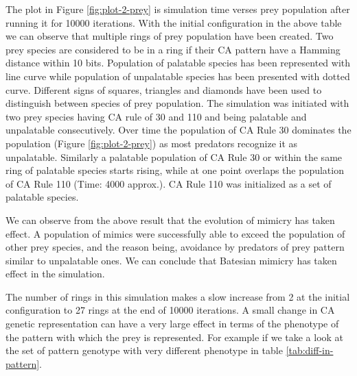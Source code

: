 \documentclass[letterpaper]{article}
\numberwithin{equation}{section}
\begin{document}
The plot in Figure \ref{fig:plot-2-prey} is simulation time verses prey population after running it for 10000 iterations. With the initial configuration in the above table we can observe that multiple rings of prey population have been created. Two prey species are considered to be in a ring if their CA pattern have a Hamming distance within 10 bits. Population of palatable species has been represented with line curve while population of unpalatable species has been presented with dotted curve. Different signs of squares, triangles and diamonds have been used to distinguish between species of prey population. The simulation was initiated with two prey species having CA rule of 30 and 110 and being palatable and unpalatable consecutively. Over time the population of CA Rule 30 dominates the population (Figure \ref{fig:plot-2-prey}) as most predators recognize it as unpalatable. Similarly a palatable population of CA Rule 30 or within the same ring of palatable species starts rising, while at one point overlaps the population of CA Rule 110 (Time: 4000 approx.). CA Rule 110 was initialized as a set of palatable species.

We can observe from the above result that the evolution of mimicry has taken effect. A population of mimics were successfully able to exceed the population of other prey species, and the reason being, avoidance by predators of prey pattern similar to unpalatable ones. We can conclude that Batesian mimicry has taken effect in the simulation.

The number of rings in this simulation makes a slow increase from 2 at the initial configuration to 27 rings at the end of 10000 iterations. A small change in CA genetic representation can have a very large effect in terms of the phenotype of the pattern with which the prey is represented. For example if we take a look at the set of pattern genotype with very different phenotype in table \ref{tab:diff-in-pattern}.
\end{document}
